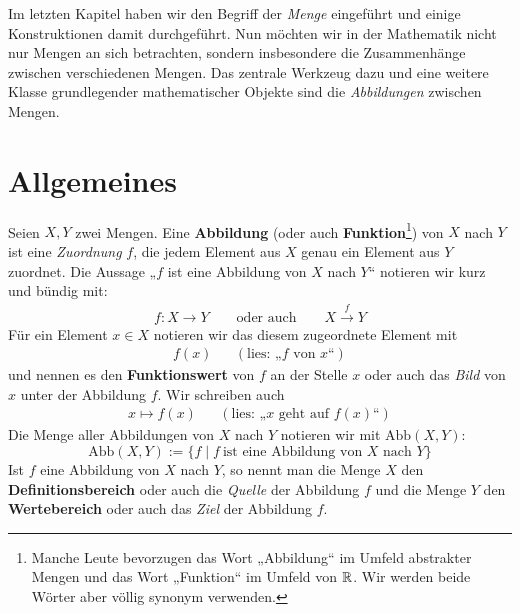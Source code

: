 %                                                                 
%
%
%


Im letzten Kapitel haben wir den Begriff der \emph{Menge} eingeführt und einige Konstruktionen damit durchgeführt. Nun möchten wir in der Mathematik nicht nur Mengen an sich betrachten, sondern insbesondere die Zusammenhänge zwischen verschiedenen Mengen. Das zentrale Werkzeug dazu und eine weitere Klasse grundlegender mathematischer Objekte sind die \emph{Abbildungen} zwischen Mengen.




\section{Allgemeines}


\begin{de}
	Seien $X,Y$ zwei Mengen. Eine \textbf{Abbildung} (oder auch \textbf{Funktion}\footnote{Manche Leute bevorzugen das Wort „Abbildung“ im Umfeld abstrakter Mengen und das Wort „Funktion“ im Umfeld von ${\mathbb R}$. Wir werden beide Wörter aber völlig synonym verwenden.}) von $X$ nach $Y$ ist eine \emph{Zuordnung} $f$, die jedem Element aus $X$ genau ein Element aus $Y$ zuordnet.
Die Aussage „$f$ ist eine Abbildung von $X$ nach $Y$“ notieren wir kurz und bündig mit:
\begin{align*}
	f:X \to Y \qquad\text{oder auch}\qquad X\xrightarrow{f} Y
\end{align*}
Für ein Element $x \in X$ notieren wir das diesem zugeordnete Element mit
\begin{align*}
 f(x)  && (\text{lies: „$f$ von $x$“})
\end{align*}
und nennen es den \textbf{Funktionswert} von $f$ an der Stelle $x$ oder auch das \emph{Bild} von $x$ unter der Abbildung $f$. Wir schreiben auch
\begin{align*}
 x\mapsto f(x) && (\text{lies: „$x$ geht auf $f(x)$“})
\end{align*}
Die Menge aller Abbildungen von $X$ nach $Y$ notieren wir mit $\text{Abb}(X,Y)$:
\[ \text{Abb}(X,Y) := \{ f \mid f\ \text{ist eine Abbildung von $X$ nach $Y$} \} \]
Ist $f$ eine Abbildung von $X$ nach $Y$, so nennt man die Menge $X$ den \textbf{Definitionsbereich} oder auch die \emph{Quelle} der Abbildung $f$ und die Menge $Y$ den \textbf{Wertebereich} oder auch das \emph{Ziel} der Abbildung $f$.
\end{de}


